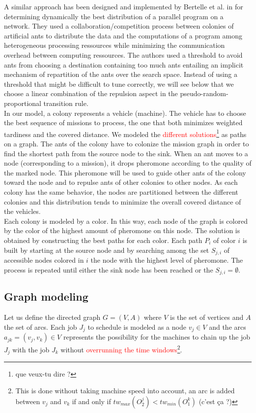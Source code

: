 \documentclass[a4paper,10pt]{article}
\begin{document}
A similar approach has been designed and implemented by Bertelle et al. in \cite{Bertelle2006,Bertelle2007} for determining dynamically the best distribution of a parallel program on a network. They used a collaboration/competition process between colonies of artificial ants to distribute the data and the computations of a program among heterogeneous processing ressources while minimizing the communication overhead between computing ressources. The authors used a threshold to avoid ants from choosing a destination containing too much ants entailing an implicit mechanism of repartition of the ants over the search space. Instead of using a threshold that might be difficult to tune correctly, we will see below that we choose a linear combination of the repulsion aspect in the pseudo-random-proportional transition rule.\\

In our model, a colony represents a vehicle (machine). The vehicle has to choose the best sequence of missions to process, the one that both minimizes weighted tardiness and the covered distance. We modeled the \textcolor{red}{different solutions}\footnote{que veux-tu dire ?} as paths on a graph. The ants of the colony have to colonize the mission graph in order to find the shortest path from the source node to the sink. When an ant moves to a node (corresponding to a mission), it drops pheromone according to the quality of the marked node. This pheromone will be used to guide other ants of the colony toward the node and to repulse ants of other colonies to other nodes. As each colony has the same behavior, the nodes are partitioned between the different colonies and this distribution tends to minimize the overall covered distance of the vehicles.\\

Each colony is modeled by a color. In this way, each node of the graph is colored by the color of the highest amount of pheromone on this node. The solution is obtained by constructing the best paths for each color. Each path $P_i$ of color $i$ is built by starting at the source node and by searching among the set $S_{j,i}$ of accessible nodes colored in $i$ the node with the highest level of pheromone. The process is repeated until either the sink node has been reached or the $S_{j,i} = \emptyset$.

\subsection{Graph modeling}
Let us define the directed graph $G = (V,A)$ where $V$ is the set of vertices and $A$ the set of arcs. Each job $J_j$ to schedule is modeled as a node $v_j \in V$ and the arcs $a_{jk} = (v_j,v_k) \in V$ represents the possibility for the machines to chain up the job $J_j$ with the job $J_k$ without \textcolor{red}{overrunning the time windows}\footnote{This is done without taking machine speed into account, an arc is added between $v_j$ and $v_k$ if and only if $tw_{max}(O_2^j) < tw_{min}(O_1^k)$ (c'est \c{c}a ?)}.\\
\end{document}
